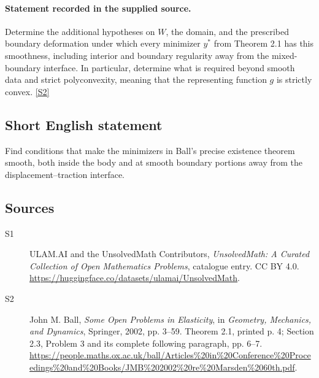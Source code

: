 \documentclass[11pt]{book}
\newcommand{\sref}[2]{\hyperlink{source:#1:#2}{[S#2]}}
\begin{document}
\paragraph{Statement recorded in the supplied source.}
Determine the additional hypotheses on $W$, the domain, and the prescribed boundary deformation under which every minimizer $y^*$ from Theorem 2.1 has this smoothness, including interior and boundary regularity away from the mixed-boundary interface. In particular, determine what is required beyond smooth data and strict polyconvexity, meaning that the representing function $g$ is strictly convex. \sref{statement}{2}
\subsection{Short English statement}
Find conditions that make the minimizers in Ball’s precise existence theorem smooth, both inside the body and at smooth boundary portions away from the displacement--traction interface.
\subsection{Sources}
\begin{description}
\item[\hypertarget{source:statement:1}{S1}] ULAM.AI and the UnsolvedMath Contributors, \emph{UnsolvedMath: A Curated Collection of Open Mathematics Problems}, catalogue entry. CC BY 4.0. \url{https://huggingface.co/datasets/ulamai/UnsolvedMath}.
\item[\hypertarget{source:statement:2}{S2}] John M. Ball, \emph{Some Open Problems in Elasticity}, in \emph{Geometry, Mechanics, and Dynamics}, Springer, 2002, pp. 3--59. Theorem 2.1, printed p. 4; Section 2.3, Problem 3 and its complete following paragraph, pp. 6--7. \url{https://people.maths.ox.ac.uk/ball/Articles%20in%20Conference%20Proceedings%20and%20Books/JMB%202002%20re%20Marsden%2060th.pdf}.
\end{description}
\label{end:statement}
\end{document}
